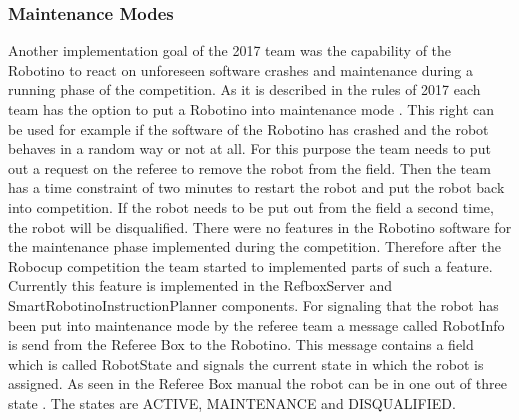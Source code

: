 \subsubsection{Maintenance Modes}

Another implementation goal of the 2017 team was the capability of the Robotino to react on unforeseen software crashes and maintenance during a running phase of the competition. As it is described in the rules of 2017 each team has the option to put a Robotino into maintenance mode \cite{RCLL17} . This right can be used for example if the software of the Robotino has crashed and the robot behaves in a random way or not at all. For this purpose the team needs to put out a request on the referee to remove the robot from the field. Then the team has a time constraint of two minutes to restart the robot and put the robot back into competition. If the robot needs to be put out from the field a second time, the robot will be disqualified. There were no features in the Robotino software for the maintenance phase implemented during the competition. Therefore after the Robocup competition the team started to implemented parts of such a feature. \\

Currently this feature is implemented in the RefboxServer and SmartRobotinoInstructionPlanner components. For signaling that the robot has been put into maintenance mode by the referee team a message called RobotInfo is send from the Referee Box to the Robotino. This message contains a field which is called RobotState and signals the current state in which the robot is assigned. As seen in the Referee Box manual the robot can be in one out of three state \cite{RM15}. The states are ACTIVE, MAINTENANCE and DISQUALIFIED. \\

